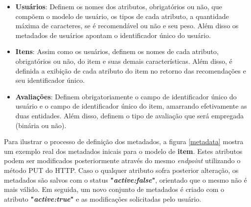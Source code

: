 \documentclass[12pt, openright, oneside, a4paper, brazil]{abntex2}
\begin{document}
\begin{itemize}
	
	\item \textbf{Usuários}: Definem os nomes dos atributos, obrigatórios ou não, que compõem o modelo de usuário, os tipos de cada atributo, a quantidade máxima de caracteres, se é recomendável ou não e seu peso. Além disso os metadados de usuários apontam o identificador único do usuário.

	\item \textbf{Itens}: Assim como os usuários, definem os nomes de cada atributo, obrigatórios ou não, do item e suas demais características. Além disso, é definida a exibição de cada atributo do item no retorno das recomendações e seu identificador único.

	\item \textbf{Avaliações}: Definem obrigatoriamente o campo de identificador único do usuário e o campo de identificador único do item, amarrando efetivamente as duas entidades. Além disso, definem o tipo de avaliação que será empregada (binária ou não).

\end{itemize}

Para ilustrar o processo de definição dos metadados, a figura \ref{metadata} mostra um exemplo real dos metadados inicais para o modelo de \textbf{item}. Estes atributos podem ser modificados posteriormente através do mesmo \textit{endpoint} utilizando o método PUT do HTTP. Caso o qualquer atributo sofra posterior alteração, os metadados são salvos com o status \textbf{"\textit{active:false}"}, orientado que o mesmo não é mais válido. Em seguida, um novo conjunto de metadados é criado com o atributo \textbf{"\textit{active:true}"} e as modificações solicitadas pelo usuário.
\end{document}
